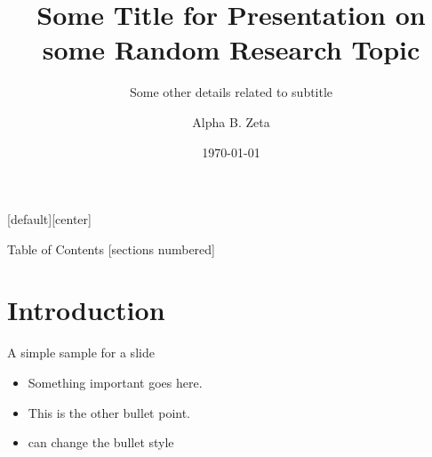 \documentclass[10pt,xcolor=table]{beamer}
\title[A shorter title]{Some Title for Presentation on some Random Research Topic}
\subtitle[test]{Some other details related to subtitle}
\date{\today}
\author[alphazeta@bu.edu]{Alpha B. Zeta}
\institute[SPTL, BU]{Center for Space Physics, Boston University}
\begin{document}
    {
    \maketitle
    }

[default][center]

\begin{frame}[plain]{Table of Contents}
    [sections numbered]
    \tableofcontents[currentsubsection,sectionstyle=show,subsectionstyle=show/shaded]
\end{frame}

\section[Intro]{Introduction}
    \begin{frame}{A simple sample for a slide}
        \begin{itemize}
            \item Something important goes here.
            \item This is the other bullet point.
            \item can change the bullet style
        \end{itemize}
    \end{frame}
\end{document}
